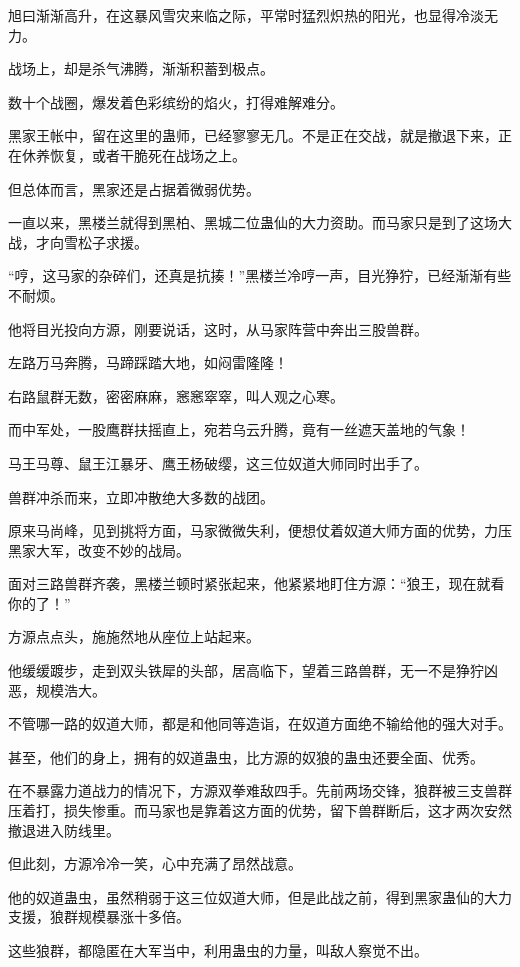 \begin{this_body}
旭曰渐渐高升，在这暴风雪灾来临之际，平常时猛烈炽热的阳光，也显得冷淡无力。

战场上，却是杀气沸腾，渐渐积蓄到极点。

数十个战圈，爆发着色彩缤纷的焰火，打得难解难分。

黑家王帐中，留在这里的蛊师，已经寥寥无几。不是正在交战，就是撤退下来，正在休养恢复，或者干脆死在战场之上。

但总体而言，黑家还是占据着微弱优势。

一直以来，黑楼兰就得到黑柏、黑城二位蛊仙的大力资助。而马家只是到了这场大战，才向雪松子求援。

“哼，这马家的杂碎们，还真是抗揍！”黑楼兰冷哼一声，目光狰狞，已经渐渐有些不耐烦。

他将目光投向方源，刚要说话，这时，从马家阵营中奔出三股兽群。

左路万马奔腾，马蹄踩踏大地，如闷雷隆隆！

右路鼠群无数，密密麻麻，窸窸窣窣，叫人观之心寒。

而中军处，一股鹰群扶摇直上，宛若乌云升腾，竟有一丝遮天盖地的气象！

马王马尊、鼠王江暴牙、鹰王杨破缨，这三位奴道大师同时出手了。

兽群冲杀而来，立即冲散绝大多数的战团。

原来马尚峰，见到挑将方面，马家微微失利，便想仗着奴道大师方面的优势，力压黑家大军，改变不妙的战局。

面对三路兽群齐袭，黑楼兰顿时紧张起来，他紧紧地盯住方源：“狼王，现在就看你的了！”

方源点点头，施施然地从座位上站起来。

他缓缓踱步，走到双头铁犀的头部，居高临下，望着三路兽群，无一不是狰狞凶恶，规模浩大。

不管哪一路的奴道大师，都是和他同等造诣，在奴道方面绝不输给他的强大对手。

甚至，他们的身上，拥有的奴道蛊虫，比方源的奴狼的蛊虫还要全面、优秀。

在不暴露力道战力的情况下，方源双拳难敌四手。先前两场交锋，狼群被三支兽群压着打，损失惨重。而马家也是靠着这方面的优势，留下兽群断后，这才两次安然撤退进入防线里。

但此刻，方源冷冷一笑，心中充满了昂然战意。

他的奴道蛊虫，虽然稍弱于这三位奴道大师，但是此战之前，得到黑家蛊仙的大力支援，狼群规模暴涨十多倍。

这些狼群，都隐匿在大军当中，利用蛊虫的力量，叫敌人察觉不出。


\end{this_body}
